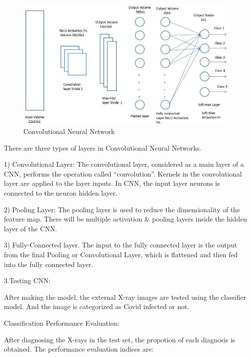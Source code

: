  
\begin{figure}[!h]
    \centering
    \includegraphics[width=\textwidth]{assets/cnn2.png}
    \caption{Convolutional Neural Network ~\cite{Uddin2021}}
\end{figure}

There are three types of layers in Convolutional Neural Networks.  

1) Convolutional Layer: The convolutional layer, considered as a main layer of a CNN, performs the operation called “convolution”. Kernels in the convolutional layer are applied to the layer inputs. In CNN, the input layer neurons is connected to the neuron hidden layer.  

2) Pooling Layer: The pooling layer is used to reduce the dimensionality of the feature map. There will be multiple activation \& pooling layers inside the hidden layer of the CNN. 

3) Fully-Connected layer. The input to the fully connected layer is the output from the final Pooling or Convolutional Layer, which is flattened and then fed into the fully connected layer. 

 

 

 

 

 

3.Testing CNN: 

After making the model, the external X-ray images are tested using the classifier model. And the image is categorized as Covid infected or not. 

 

Classification Performance Evaluation: 

After diagnosing the X-rays in the test set, the propotion of each diagnosis is obtained. The performance evaluation indices are: 

